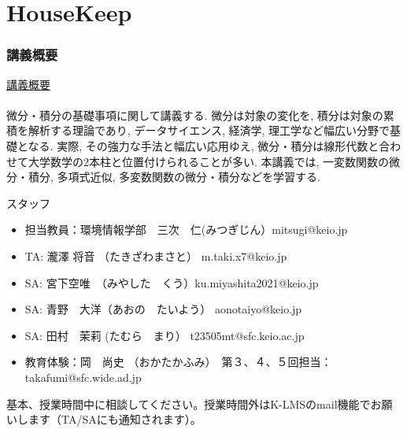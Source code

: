 \section{HouseKeep}
\begin{frame}
\frametitle{講義概要}   

\underline{講義概要} \\
\ \\

微分・積分の基礎事項に関して講義する. 
微分は対象の変化を, 積分は対象の累積を解析する理論であり, データサイエンス, 経済学, 理工学など幅広い分野で基礎となる. 
実際, その強力な手法と幅広い応用ゆえ, 微分・積分は線形代数と合わせて大学数学の2本柱と位置付けられることが多い. 
本講義では, 一変数関数の微分・積分, 多項式近似, 多変数関数の微分・積分などを学習する. 





\end{frame}

\begin{slide}{スタッフ}
\begin{itemize}
\item 担当教員：環境情報学部　三次　仁(みつぎじん）mitsugi@keio.jp
\item TA:  瀧澤 将音 （たきざわまさと） m.taki.x7@keio.jp
\item SA:  宮下空唯　（みやした　くう）ku.miyashita2021@keio.jp
\item SA: 青野　大洋（あおの　たいよう） aonotaiyo@keio.jp
\item SA: 田村　茉莉 (たむら　まり） t23505mt@sfc.keio.ac.jp
\item 教育体験：岡　尚史 （おかたかふみ）　第３、４、５回担当：takafumi@sfc.wide.ad.jp
\end{itemize}
基本、授業時間中に相談してください。授業時間外はK-LMSのmail機能でお願いします（TA/SAにも通知されます）。
\end{slide}

